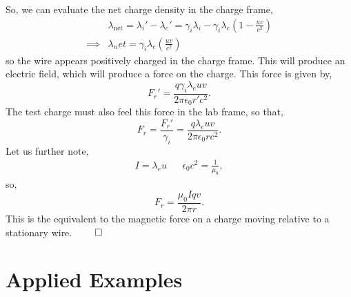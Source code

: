 \documentclass{book}
\begin{document}
So, we can evaluate the net charge density in the charge frame,
\begin{equation}
\begin{split}
	&\lambda_{\text{net}} = \lambda_i' - \lambda_e' = \gamma_i\lambda_i - \gamma_i\lambda_e\left(1 - \frac{uv}{c^2}\right)\\
	\implies & \lambda_net = \gamma_i\lambda_e\left(\frac{uv}{c^2}\right)
\end{split}
\end{equation}
so the wire appears positively charged in the charge frame. This will produce an electric field, which will produce a force on the charge. This force is given by,
\begin{equation}
	F_r' = \frac{q\gamma_i\lambda_euv}{2\pi\epsilon_0r'c^2}.
\end{equation}
The test charge must also feel this force in the lab frame, so that,
\begin{equation}
	F_r = \frac{F_r'}{\gamma_i} = \frac{q\lambda_euv}{2\pi\epsilon_0rc^2}.
\end{equation}
Let us further note,
\begin{align}
	I = \lambda_e u && \epsilon_0c^2 = \frac{1}{\mu_0},
\end{align}
so,
\begin{equation}
	F_r = \frac{\mu_0 I qv}{2\pi r}.
\end{equation}
This is the equivalent to the magnetic force on a charge moving relative to a stationary wire. $\qed$
\appendix
\chapter{Applied Examples}
\end{document}
